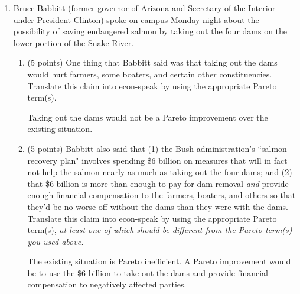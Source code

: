 \documentclass[twoside]{article}
\begin{document}
\begin{enumerate}


\item \begin{EXAM} Bruce Babbitt (former governor of Arizona and Secretary of the Interior under President Clinton) spoke on campus Monday night about the possibility of saving endangered salmon by taking out the four dams on the lower portion of the Snake River. \end{EXAM}

    \begin{enumerate}

    \item \begin{EXAM} (5 points) One thing that Babbitt said was that taking out the dams would hurt farmers, some boaters, and certain other constituencies. Translate this claim into econ-speak by using the appropriate Pareto term(s). \vspace{3cm} \end{EXAM}

\begin{KEY}
Taking out the dams would not be a Pareto improvement over the existing situation.
\end{KEY}

    \item \begin{EXAM} (5 points) Babbitt also said that (1) the Bush administration's ``salmon recovery plan" involves spending \$6 billion on measures that will in fact not help the salmon nearly as much as taking out the four dams; and (2) that \$6 billion is more than enough to pay for dam removal \emph{and} provide enough financial compensation to the farmers, boaters, and others so that they'd be no worse off without the dams than they were with the dams. Translate this claim into econ-speak by using the appropriate Pareto term(s), \emph{at least one of which should be different from the Pareto term(s) you used above.}  \vspace{3cm} \end{EXAM}

\begin{KEY}
The existing situation is Pareto inefficient. A Pareto improvement would be to use the \$6 billion to take out the dams and provide financial compensation to negatively affected parties.
\end{KEY}

    \end{enumerate}






\end{enumerate}
\end{document}
